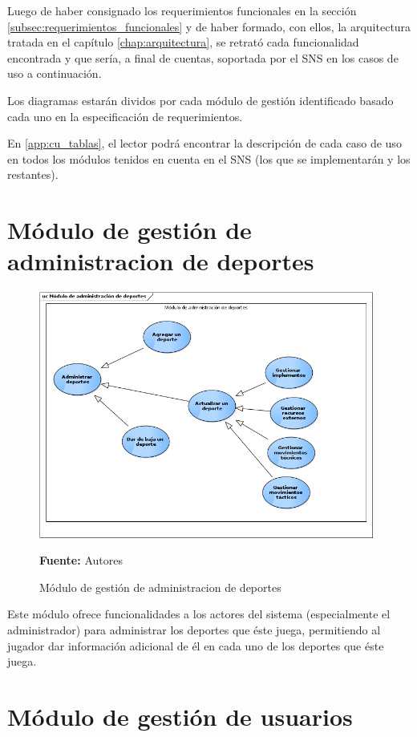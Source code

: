Luego de haber consignado los requerimientos funcionales en la sección \ref{subsec:requerimientos_funcionales} y de haber formado, con ellos, la arquitectura tratada en el capítulo \ref{chap:arquitectura}, se retrató cada funcionalidad encontrada y que sería, a final de cuentas, soportada por el SNS en los casos de uso a continuación.

Los diagramas estarán dividos por cada módulo de gestión identificado basado cada uno en la especificación de requerimientos.

En \ref{app:cu_tablas}, el lector podrá encontrar la descripción de cada caso de uso en todos los módulos tenidos en cuenta en el SNS (los que se implementarán y los restantes).

\section{Módulo de gestión de administracion de deportes}


\begin{figure}[!htb]
  \begin{center}
    \includegraphics[width=11cm]{./imagenes/casos_uso/administracion_deportes.png}
    \caption{Módulo de gestión de administracion de deportes}
    \label{fig:cu_admin_dep}
    \textbf{Fuente:} Autores
  \end{center}
\end{figure}

Este módulo ofrece funcionalidades a los actores del sistema (especialmente el administrador) para administrar los deportes que éste juega, permitiendo al jugador dar información adicional de él en cada uno de los deportes que éste juega.

\section{Módulo de gestión de usuarios}

